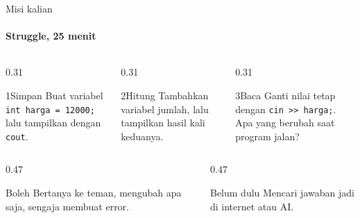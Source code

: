 \documentclass[t]{beamer}
\begin{document}

\begin{frame}{Misi kalian}
\framesubtitle{Struggle, 25 menit}
\begin{columns}[T]
\begin{column}{0.31\textwidth}
\begin{Langkah}{1}{Simpan}
Buat variabel \texttt{int harga = 12000;} lalu tampilkan dengan \texttt{cout}.
\end{Langkah}
\end{column}
\begin{column}{0.31\textwidth}
\begin{Langkah}{2}{Hitung}
Tambahkan variabel jumlah, lalu tampilkan hasil kali keduanya.
\end{Langkah}
\end{column}
\begin{column}{0.31\textwidth}
\begin{Langkah}{3}{Baca}
Ganti nilai tetap dengan \texttt{cin >> harga;}. Apa yang berubah saat program jalan?
\end{Langkah}
\end{column}
\end{columns}
\vspace{8pt}
\begin{columns}[T]
\begin{column}{0.47\textwidth}
\begin{Blok}{Boleh}
Bertanya ke teman, mengubah apa saja, sengaja membuat error.
\end{Blok}
\end{column}
\begin{column}{0.47\textwidth}
\begin{BlokAlert}{Belum dulu}
Mencari jawaban jadi di internet atau AI.
\end{BlokAlert}
\end{column}
\end{columns}
\end{frame}
\end{document}
